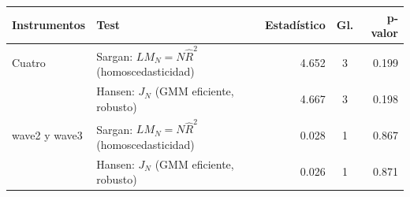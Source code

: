 
\begin{tabular}{llrcr}
\toprule
Instrumentos & Test & Estadístico & Gl. & p-valor\\
\midrule
Cuatro & Sargan: $LM_N=N\hat R^2$ (homoscedasticidad) & 4.652 & 3 & 0.199\\
 & Hansen: $J_N$ (GMM eficiente, robusto) & 4.667 & 3 & 0.198\\
wave2 y wave3 & Sargan: $LM_N=N\hat R^2$ (homoscedasticidad) & 0.028 & 1 & 0.867\\
 & Hansen: $J_N$ (GMM eficiente, robusto) & 0.026 & 1 & 0.871\\
\bottomrule
\end{tabular}

